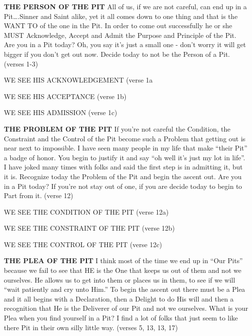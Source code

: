 \begin{compactenum}[I.]
    \item \textbf{THE PERSON OF THE PIT} All of us, if we are not careful, can end up in a Pit….Sinner and Saint alike, yet it all comes down to one thing and that is the WANT TO of the one in the Pit. In order to come out successfully he or she MUST Acknowledge, Accept and Admit the Purpose and Principle of the Pit. Are you in a Pit today? Oh, you say it’s just a small one - don’t worry it will get bigger if you don’t get out now. Decide today to not be the Person of a Pit.  (verses 1-3) 
    \begin{compactenum}
        \item WE SEE HIS ACKNOWLEDGEMENT (verse 1a
        \item WE SEE HIS ACCEPTANCE (verse 1b)
        \item WE SEE HIS ADMISSION (verse 1c)
    \end{compactenum}
    \item \textbf{THE PROBLEM OF THE PIT} If you’re not careful the Condition, the Constraint and the Control of the Pit become such a Problem that getting out is near next to impossible. I have seen many people in my life that make ``their Pit'' a badge of honor. You begin to justify it and say ``oh well it’s just my lot in life''. I have joked many times with folks and said the first step is in admitting it, but it is. Recognize today the Problem of the Pit and begin the ascent out. Are you in a Pit today? If you’re not stay out of one, if you are decide today to begin to Part from it. (verse 12)
    \begin{compactenum}
        \item WE SEE THE CONDITION OF THE PIT (verse 12a)
        \item WE SEE THE CONSTRAINT OF THE PIT (verse 12b)
        \item WE SEE THE CONTROL OF THE PIT (verse 12c)
    \end{compactenum}
    \item \textbf{THE PLEA OF THE PIT} I think most of the time we end up in ``Our Pits'' because we fail to see that HE is the One that keeps us out of them and not we ourselves. He allows us to get into them or places us in them, to see if we will ``wait patiently and cry unto Him.'' To begin the ascent out there must be a Plea and it all begins with a Declaration, then a Delight to do His will and then a recognition that He is the Deliverer of our Pit and not we ourselves.  What is your Plea when you find yourself in a Pit? I find a lot of folks that just seem to like there Pit in their own silly little way.  (verses 5, 13, 13, 17)

\end{compactenum}
